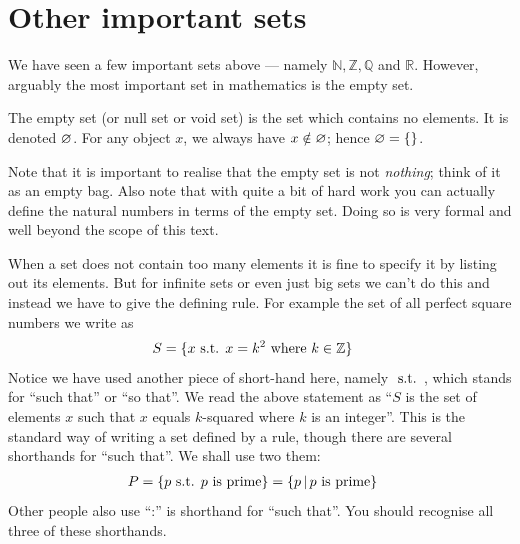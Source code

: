 \section{Other important sets}
We have seen a few important sets above --- namely $\mathbb{N}, \mathbb{Z},
\mathbb{Q}$ and $\mathbb{R}$. However, arguably the most important set in
mathematics is the empty set.
\begin{defn}
  The empty set (or null set or void set) is the set which contains no
elements. It is denoted ${\varnothing}$. For any object $x$, we always
have $x \notin {\varnothing}$; hence ${\varnothing} = \{ \}$.
\end{defn}
Note that it is important to realise that the empty set is not \emph{nothing}; think of it
as an empty bag. Also note that with quite a bit of hard work you can actually define the
natural numbers in terms of the empty set. Doing so is very formal and well beyond the
scope of this text.


When a set does not contain too many elements it is fine to specify it by listing out its
elements.  But for infinite sets or even just big sets we can't do this and instead we
have to give the defining rule. For example the set of all perfect square numbers we
write as
\begin{align*}
  S &= \{x {\mbox{ s.t. }} x = k^2 \mbox{ where } k \in \mathbb{Z} \}
\end{align*}
Notice we have used another piece of short-hand here, namely ${\mbox{ s.t. }}$, which
stands for ``such that'' or ``so that''. We read the above statement as ``$S$ is
the set of elements $x$ such that $x$ equals $k$-squared where $k$ is an
integer''. This is the standard way of writing a set defined by a rule, though there are
several shorthands for ``such that''. We shall use two them:
\begin{align*}
  P &= \{ p {\mbox{ s.t. }} p \mbox{ is prime} \} = \{ p \,|\, p \mbox{ is prime} \}
\end{align*}
Other people also use ``:'' is shorthand for ``such that''. You should recognise all
three of these shorthands.

